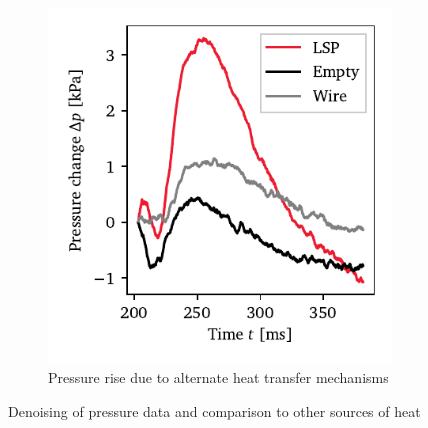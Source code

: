 \begin{figure}[h]
\begin{subfigure}[t]{0.47\textwidth}
                    \includegraphics[width=\textwidth]{assets/5 results/pressure_elim}
                    \caption{Pressure rise due to alternate heat transfer mechanisms}
                    \label{fig:pressure_elim}
                \end{subfigure}
                \caption{Denoising of pressure data and comparison to other sources of heat}
            \end{figure}

